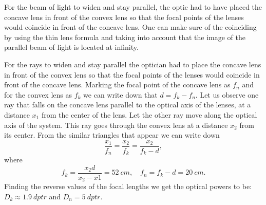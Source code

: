 {\ifEngHint
For the beam of light to widen and stay parallel, the optic had to have placed the concave lens in front of the convex lens so that the focal points of the lenses would coincide in front of the concave lens. One can make sure of the coinciding by using the thin lens formula and taking into account that the image of the parallel beam of light is located at infinity.
\fi


\ifEngSolution
For the rays to widen and stay parallel the optician had to place the concave lens in front of the convex lens so that the focal points of the lenses would coincide in front of the concave lens. Marking the focal point of the concave lens as $f_{n}$ and for the convex lens as $f_{k}$ we can write down that $d=f_{k}-f_{n}$. Let us observe one ray that falls on the concave lens parallel to the optical axis of the lenses, at a distance $x_{1}$ from the center of the lens. Let the other ray move along the optical axis of the system. This ray goes through the convex lens at a distance $x_{2}$ from its center. From the similar triangles that appear we can write down
\[ \frac{x_{1}}{f_{n}}=\frac{x_{2}}{f_{k}}=\frac{x_{2}}{f_{k}-d}, \] 
where
\[ f_{k}=\frac{x_{2}d}{x_{2}-x{1}}=\SI{52}{cm},\quad  f_{n}=f_{k}-d=\SI{20}{cm}.\] 
Finding the reverse values of the focal lengths we get the optical powers to be: $D_{k}\approx\SI{1,9}{dptr}$ and $D_{n}=\SI{5}{dptr}$.
\fi
}